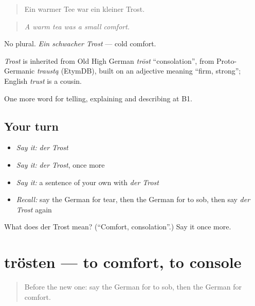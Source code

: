 \begin{quote}
Ein warmer Tee war ein kleiner Trost.
\end{quote}

\begin{quote}
\emph{A warm tea was a small comfort.}
\end{quote}

No plural. \emph{Ein schwacher Trost} — cold comfort.

\begin{cousinweb}
\emph{Trost} is inherited from Old High German \emph{trōst} \textquotedblleft{}consolation\textquotedblright{}, from Proto-Germanic \emph{traustą} (EtymDB), built on an adjective meaning \textquotedblleft{}firm, strong\textquotedblright{}; English \emph{trust} is a cousin.
\end{cousinweb}

\begin{grammarlens}[title={What you've built}]
One more word for telling, explaining and describing at B1.
\end{grammarlens}

\subsection*{Your turn}
\begin{itemize}
\raggedright
  \item \emph{Say it:} \emph{der Trost}
  \item \emph{Say it:} \emph{der Trost}, once more
  \item \emph{Say it:} a sentence of your own with \emph{der Trost}
  \item \emph{Recall:} say the German for tear, then the German for to sob, then say \emph{der Trost} again
\end{itemize}

\begin{tcolorbox}[breakable,colback=teal!4,colframe=teal!35!black,title={Before you move on}]
What does der Trost mean? (\textquotedblleft{}Comfort, consolation\textquotedblright{}.) Say it once more.
\end{tcolorbox}
\section[trösten]{trösten — to comfort, to console}

\label{lesson:GE-C471-troesten}



\begin{quote}
Before the new one: say the German for to sob, then the German for comfort.
\end{quote}

